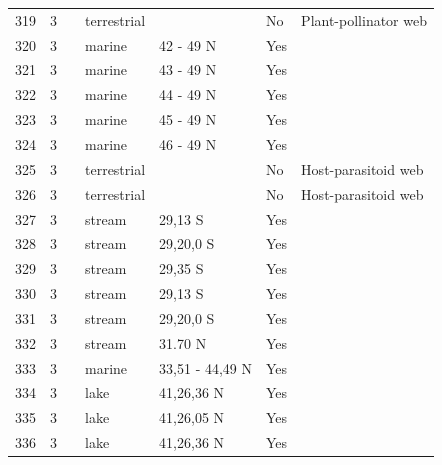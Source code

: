 \documentclass[12pt]{article}
\begin{document}
\begin{landscape}
\begin{table}[h!]
{\begin{tabular}{p{2.8cm}p{1.3cm}p{3cm}p{2.2cm}p{2.5cm}lp{8.2cm}}
        319   & 3 & \cite{Kaiser-Bunbury2011}  & terrestrial &       & No    & Plant-pollinator web \\
        320   & 3 & \cite{Ruzicka2012}    & marine & 42 - 49 N & Yes  &     \\
        321   & 3 & \cite{Ruzicka2012}    & marine & 43 - 49 N & Yes  &     \\
        322   & 3 & \cite{Ruzicka2012}    & marine & 44 - 49 N & Yes  &     \\
        323   & 3 & \cite{Ruzicka2012}    & marine & 45 - 49 N & Yes  &     \\
        324   & 3 & \cite{Ruzicka2012}    & marine & 46 - 49 N & Yes  &     \\
        325   & 3 & \cite{Lewis2002}  & terrestrial &       & No    & Host-parasitoid web \\
        326   & 3 & \cite{Lewis2002}  & terrestrial &       & No    & Host-parasitoid web \\
        327   & 3 & \cite{Kelleway2010}  & stream & 29,13 S & Yes   &       \\
        328   & 3 & \cite{Kelleway2010}  & stream & 29,20,0 S & Yes   &       \\
        329   & 3 & \cite{Kelleway2010}  & stream & 29,35 S & Yes   &       \\
        330   & 3 & \cite{Kelleway2010}  & stream & 29,13 S & Yes   &       \\
        331   & 3 & \cite{Kelleway2010}  & stream & 29,20,0 S & Yes   &       \\
        332   & 3 & \cite{Huang2008}  & stream & 31.70 N & Yes   &       \\
        333   & 3 & \cite{Link2002}    & marine & 33,51 - 44,49 N & Yes  &     \\
        334   & 3 & \cite{Alcorlo2001}  & lake  & 41,26,36 N & Yes   &       \\
        335   & 3 & \cite{Alcorlo2001}  & lake  & 41,26,05 N & Yes   &       \\
        336   & 3 & \cite{Alcorlo2001}  & lake  & 41,26,36 N & Yes   &       \\
         \hline
      \end{tabular}}%
      \end{table}

        \newpage


\end{landscape}
\end{document}
